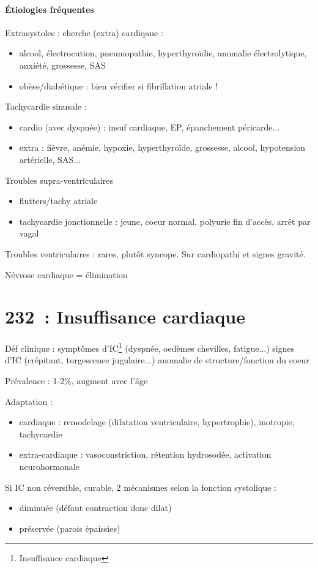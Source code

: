 \paragraph{Étiologies fréquentes}
Extrasystoles : cherche (extra) cardiqaue :
\begin{itemize}
  \item alcool, électrocution, pneumopathie, hyperthyroïdie, anomalie
    électrolytique, anxiété, grossesse, SAS
  \item \danger{} obèse/diabétique : bien vérifier si fibrillation atriale !
\end{itemize}
Tachycardie sinusale :
\begin{itemize}
  \item cardio (avec dyspnée) : insuf cardiaque, EP, épanchement péricarde...
  \item extra : fièvre, anémie, hypoxie, hyperthyroïde, grossesse, alcool,
    hypotension artérielle, SAS...
\end{itemize}
Troubles supra-ventriculaires
\begin{itemize}
  \item flutters/tachy atriale
  \item tachycardie jonctionnelle : jeune, coeur normal, polyurie fin d'accès,
    arrêt par vagal
\end{itemize}
Troubles ventriculaires : rares, plutôt syncope. Sur cardiopathi et signes
gravité.

Névrose cardiaque = élimination


\section{232 : Insuffisance cardiaque}%
\label{sec:insuffisance_cardiaque}
Déf clinique : symptômes d'IC\footnote{Insuffisance cardiaque} (dyspnée, oedèmes
chevilles, fatigue...) \land{} signes d'IC (crépitant, turgescence jugulaire...)
\land{} anomalie de structure/fonction du coeur

Prévalence : 1-2\%, augment avec l'âge

Adaptation :
\begin{itemize}
  \item cardiaque : remodelage (dilatation ventriculaire, hypertrophie), \inc
    inotropie, tachycardie
  \item extra-cardiaque : vasoconstriction, rétention hydrosodée, activation
    neurohormonale
\end{itemize}
Si IC non réversible, curable, 2 mécanismes selon la fonction systolique :
\begin{itemize}
  \item diminuée (défaut contraction donc dilat)
  \item préservée (parois épaissies)
\end{itemize}

